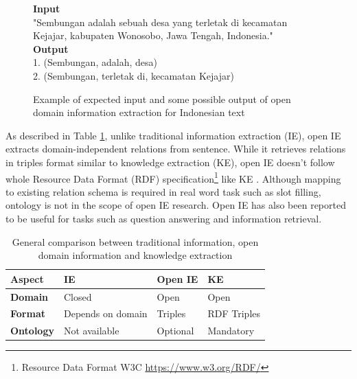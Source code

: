 \documentclass[conference,compsoc,12pt]{IEEEtran}
\begin{document}
\begin{figure}
\begin{mdframed}
\textbf{Input} \\[0.1cm]
"Sembungan adalah sebuah desa yang terletak di kecamatan Kejajar, kabupaten Wonosobo, Jawa Tengah, Indonesia." \\[0.5cm]
\textbf{Output} \\[0.1cm]
1. (Sembungan, adalah, desa) \\
2. (Sembungan, terletak di, kecamatan Kejajar)
\end{mdframed}
\caption{Example of expected input and some possible output of open domain information extraction for Indonesian text}
\label{fig_example_io_openie}
\end{figure}

As described in Table \ref{table_paradigm_comparison}, unlike traditional information extraction (IE), open IE extracts domain-independent relations from sentence. While it retrieves relations in triples format similar to knowledge extraction (KE), open IE doesn't follow whole Resource Data Format (RDF) specification\footnote{Resource Data Format W3C \url{https://www.w3.org/RDF/}} like KE\cite{auer2007dbpedia} \cite{exner2014refractive}. Although mapping to existing relation schema is required in real word task such as slot filling\cite{angeli2015leveraging}, ontology is not in the scope of open IE research. Open IE has also been reported to be useful for tasks such as question answering\cite{fader2011identifying} and information retrieval\cite{etzioni2011search}. 

\begin{table}
\renewcommand{\arraystretch}{1.5}
\caption{General comparison between traditional information, open domain information and knowledge extraction}
\label{table_paradigm_comparison}
\centering
\begin{tabular}{l >{\centering\arraybackslash}p{1.9cm} >{\centering\arraybackslash}p{1.9cm} >{\centering\arraybackslash}p{1.9cm}}
\hline 
\textbf{Aspect} & \textbf{IE} & \textbf{Open IE} & \textbf{KE} \\ 
\hline 
\textbf{Domain} & Closed & Open & Open \\ 
\textbf{Format} & Depends on domain & Triples & RDF Triples \\ 
\textbf{Ontology} & Not available & Optional & Mandatory \\ 
\hline 
\end{tabular} 
\end{table}
\end{document}
